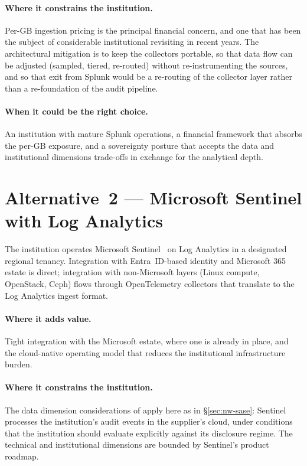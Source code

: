 \paragraph{Where it constrains the institution.} Per-GB ingestion
pricing is the principal financial concern, and one that has been
the subject of considerable institutional revisiting in recent
years. The architectural mitigation is to keep the collectors
portable, so that data flow can be adjusted (sampled, tiered,
re-routed) without re-instrumenting the sources, and so that exit
from Splunk would be a re-routing of the collector layer rather
than a re-foundation of the audit pipeline.

\paragraph{When it could be the right choice.} An institution with
mature Splunk operations, a financial framework that absorbs the
per-GB exposure, and a sovereignty posture that accepts the data
and institutional dimensions trade-offs in exchange for the
analytical depth.

\section{Alternative~2 --- Microsoft Sentinel with Log Analytics}
\label{sec:ob-alt2}

\begin{alternativebox}
\noindent The institution operates Microsoft Sentinel~\cite{microsoft-sentinel} on Log
Analytics in a designated regional tenancy. Integration with
Entra~ID-based identity and Microsoft 365 estate is direct;
integration with non-Microsoft layers (Linux compute, OpenStack,
Ceph) flows through OpenTelemetry collectors that translate to
the Log Analytics ingest format.
\end{alternativebox}

\paragraph{Where it adds value.} Tight integration with the
Microsoft estate, where one is already in place, and the
cloud-native operating model that reduces
the institutional infrastructure burden.

\paragraph{Where it constrains the institution.} The data
dimension considerations of  apply
here as in \S\ref{sec:nw-sase}: Sentinel processes the institution's
audit events in the supplier's cloud, under conditions that the
institution should evaluate explicitly against its disclosure
regime. The technical and institutional dimensions are bounded by
Sentinel's product roadmap.

